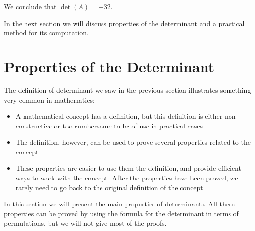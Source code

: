 \documentclass[12pt]{article}
\begin{document}
\begin{center}
\end{center}
We conclude that $\det(A)=-32$.

In the next section we will discuss properties of the determinant and a practical method for its computation.

\section{Properties of the Determinant}

The definition of determinant we saw in the previous section illustrates something very common in mathematics:

\begin{itemize}
\item A mathematical concept has a definition, but this definition is either non-constructive or too cumbersome to be of use in practical cases.
\item The definition, however, can be used to prove several properties related to the concept.
\item These properties are easier to use them the definition, and provide efficient ways to work with the concept. After the properties have been proved, we rarely need to go back to the original definition of the concept.
\end{itemize} 

In this section we will present the main properties of determinants. All these properties can be proved by using the formula for the determinant in terms of permutations, but we will not give most of the proofs.
\end{document}
